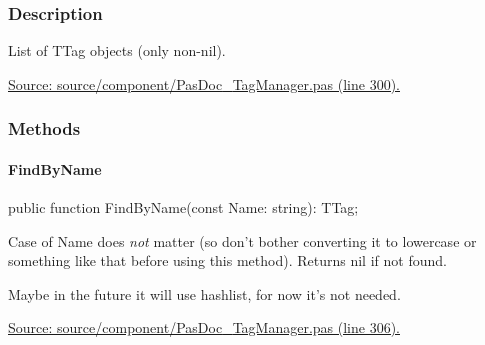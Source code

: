 \documentclass{report}
\newif\ifpdf
\begin{document}
\subsubsection*{\large{\textbf{Description}}\normalsize\hspace{1ex}\hfill}
List of TTag objects (only non{-}nil).\par
\href{https://github.com/pasdoc/pasdoc/blob/master/source/component/PasDoc_TagManager.pas#L300}{Source: source/component/PasDoc{\_}TagManager.pas (line 300).}\subsubsection*{\large{\textbf{Methods}}\normalsize\hspace{1ex}\hfill}
\paragraph*{FindByName}\hspace*{\fill}

\label{PasDoc_TagManager.TTagVector-FindByName}
\begin{list}{}{
\setlength{\itemindent}{0cm}
\setlength{\listparindent}{0cm}
\setlength{\leftmargin}{\evensidemargin}
\addtolength{\leftmargin}{\tmplength}
\settowidth{\labelsep}{X}
\addtolength{\leftmargin}{\labelsep}
\setlength{\labelwidth}{\tmplength}
}
\item[\textbf{Declaration}\hfill]
\ifpdf
\begin{flushleft}
\fi
\begin{ttfamily}
public function FindByName(const Name: string): TTag;\end{ttfamily}

\ifpdf
\end{flushleft}
\fi

\par
\item[\textbf{Description}]
Case of Name does \textit{not} matter (so don't bother converting it to lowercase or something like that before using this method). Returns nil if not found.

Maybe in the future it will use hashlist, for now it's not needed.\par
\href{https://github.com/pasdoc/pasdoc/blob/master/source/component/PasDoc_TagManager.pas#L306}{Source: source/component/PasDoc{\_}TagManager.pas (line 306).}

\end{list}
\ifpdf
\end{document}
